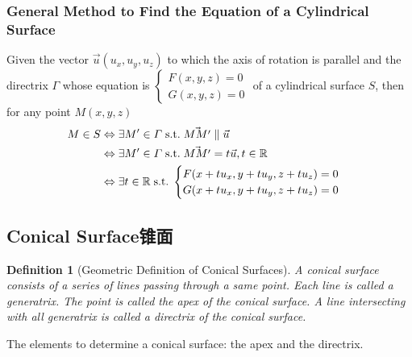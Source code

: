 \documentclass[onecolumn]{ctexart}
\newtheorem{definition}{Definition}
\begin{document}
\subsubsection{General Method to Find the Equation of a Cylindrical Surface}
Given the vector $\vec{u}(u_x, u_y, u_z)$ to which the axis of rotation is parallel and the directrix $\varGamma$ whose equation is $
\begin{cases}
  F(x, y, z) = 0 \\
  G(x, y, z) = 0
\end{cases}$ of a cylindrical surface $S$, then for any point $M(x, y, z)$
\begin{equation}
  \begin{split}
    M \in S &\Leftrightarrow \exists M' \in \varGamma \thickspace \textnormal{s.t.} \thickspace \vec{MM'} \parallel \vec{u} \\
            &\Leftrightarrow \exists M' \in \varGamma \thickspace \textnormal{s.t.} \thickspace \vec{MM'} = t\vec{u}, t \in \mathbb{R} \\
            &\Leftrightarrow \exists t \in \mathbb{R} \thickspace \textnormal{s.t.} \thickspace 
            \begin{cases}
              F(x + t u_x, y + t u_y, z + t u_z) = 0 \\
              G(x + t u_x, y + t u_y, z + t u_z) = 0
            \end{cases}
  \end{split}
\end{equation}


\subsection{Conical Surface锥面}

\begin{definition}[Geometric Definition of Conical Surfaces]
  A conical surface consists of a series of lines passing through a same point. 
  Each line is called a generatrix. The point is called the apex of the conical 
  surface. A line intersecting with all generatrix is called a directrix of the 
  conical surface.
\end{definition}

The elements to determine a conical surface: the apex and the directrix.
\end{document}
